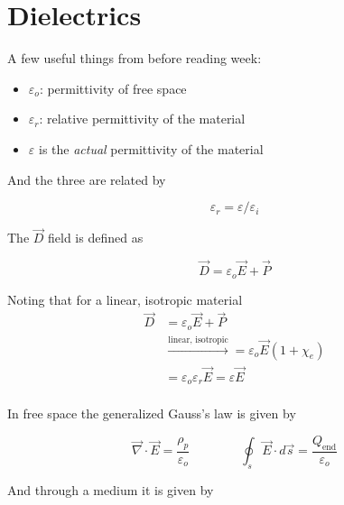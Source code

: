 \documentclass[10pt]{article}
\begin{document}
\section{Dielectrics}
\begin{blockquote}
	A few useful things from before reading week:

	\begin{itemize}
		\item $ \varepsilon_o $: permittivity of free space
		\item $ \varepsilon_r $: relative permittivity of the material
	\item $ \varepsilon $ is the \textit{actual} permittivity of the material
	\end{itemize}
	And the three are related by

	\begin{equation}
		 \varepsilon_r = \varepsilon / \varepsilon_i 
		 \label{eq:259:epsilons}
	\end{equation}


	The $ \vec{D} $ field is defined as 

	\begin{equation}
		\vec{D} = \varepsilon_o \vec{E} + \vec{P}
		\label{eq:259:D_field}
	\end{equation}


	Noting that for a linear, isotropic material 
		\begin{equation}
			\begin{split}
				\vec{D} &= \varepsilon_o \vec{E} + \vec{P}  \\
								&\xrightarrow{\text{linear, isotropic}} = \varepsilon_o \vec{E}(1 + \chi_e)  \\
								&= \varepsilon_o \varepsilon_r \vec{E} = \varepsilon \vec{E}  \\
								\label{eq:259:D_field_linear-isotropic}
			\end{split}
		\end{equation}
	

	In free space the generalized Gauss's law is given by

	\begin{equation}
	\vec{\nabla }\cdot \vec{E} = \frac{\rho_p}{\varepsilon_o} \qquad \qquad
	\oint_s \vec{E} \cdot d\vec{s} = \frac{Q_\text{end} }{\varepsilon_o}
		\label{eq:259:gauss_free_space}
	\end{equation}

	And through a medium it is given by


\end{blockquote}
\end{document}
